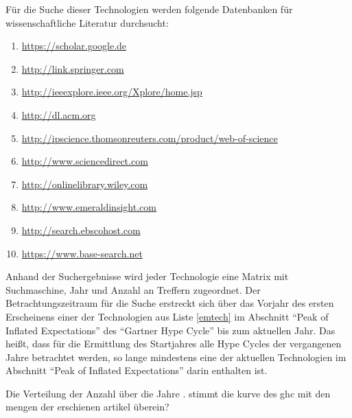Für die Suche dieser Technologien werden folgende Datenbanken für wissenschaftliche Literatur durchsucht:
\begin{enumerate}
	\item \url{https://scholar.google.de}
	\item \url{http://link.springer.com}
	\item \url{http://ieeexplore.ieee.org/Xplore/home.jsp}
	\item \url{http://dl.acm.org}
	\item \url{http://ipscience.thomsonreuters.com/product/web-of-science}
	\item \url{http://www.sciencedirect.com}
	\item \url{http://onlinelibrary.wiley.com}
	\item \url{http://www.emeraldinsight.com}
	\item \url{http://search.ebscohost.com}
	\item \url{https://www.base-search.net}
\end{enumerate}

Anhand der Suchergebnisse wird jeder Technologie eine Matrix mit Suchmaschine, Jahr und Anzahl an Treffern zugeordnet. 
Der Betrachtungszeitraum für die Suche erstreckt sich über das Vorjahr des ersten Erscheinens einer der Technologien aus Liste \ref{emtech} im Abschnitt "`Peak of Inflated Expectations"' des "`Gartner Hype Cycle"' bis zum aktuellen Jahr. Das heißt, dass für die Ermittlung des Startjahres alle Hype Cycles der vergangenen Jahre betrachtet werden, so lange mindestens eine der aktuellen Technologien im Abschnitt "`Peak of Inflated Expectations"' darin enthalten ist.









Die Verteilung der Anzahl über die Jahre . stimmt die kurve des ghc mit den mengen der erschienen artikel überein?
